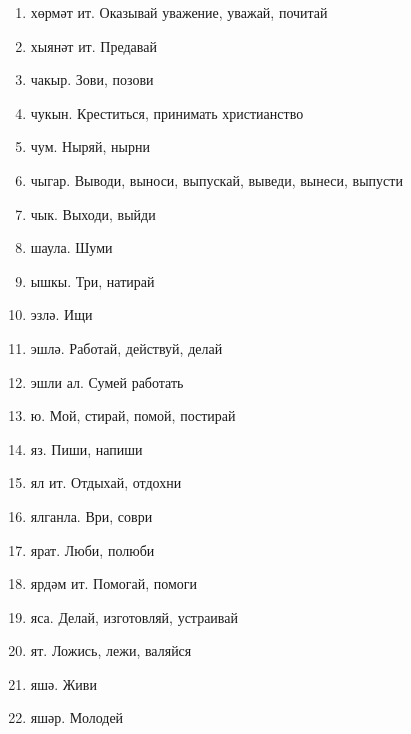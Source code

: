 \documentclass{article}
\begin{document}
\begin{enumerate}
    \item хөрмәт ит. Оказывай уважение, уважай, почитай
    \item хыянәт ит. Предавай
    \item чакыр. Зови, позови
    \item чукын. Креститься, принимать христианство
    \item чум. Ныряй, нырни
    \item чыгар. Выводи, выноси, выпускай, выведи, вынеси, выпусти
    \item чык. Выходи, выйди
    \item шаула. Шуми
    \item ышкы. Три, натирай
    \item эзлә. Ищи
    \item эшлә. Работай, действуй, делай
    \item эшли ал. Сумей работать
    \item ю. Мой, стирай, помой, постирай
    \item яз. Пиши, напиши
    \item ял ит. Отдыхай, отдохни
    \item ялганла. Ври, соври
    \item ярат. Люби, полюби
    \item ярдәм ит. Помогай, помоги
    \item яса. Делай, изготовляй, устраивай
    \item ят. Ложись, лежи, валяйся
    \item яшә. Живи
    \item яшәр. Молодей
\end{enumerate}
\end{document}
